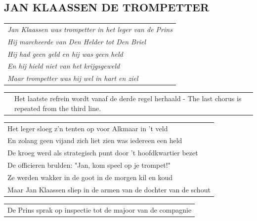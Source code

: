 \documentclass{article}
\begin{document}
\subsection*{JAN KLAASSEN DE TROMPETTER}
\begin{flushleft}
\begin{tabularx}{0.8\textwidth} {
   >{\raggedright\arraybackslash}X}
   \textit{Jan Klaassen was trompetter in het leger van de Prins}\\
\textit{Hij marcheerde van Den Helder tot Den Briel}\\
\textit{Hij had geen geld en hij was geen held}\\
\textit{En hij hield niet van het krijgsgeweld}\\
\textit{Maar trompetter was hij wel in hart en ziel}\\
\end{tabularx}
\end{flushleft}\begin{flushleft}
\begin{tabularx}{\textwidth} {
   c >{\raggedright\arraybackslash}X}
    \hspace{5mm} & {\small Het laatste refrein wordt vanaf de derde regel herhaald - The last chorus is repeated from the third line.}\\
\end{tabularx}
\end{flushleft}\begin{flushleft}
\begin{tabularx}{\textwidth} {
   >{\raggedright\arraybackslash}X}
Het leger sloeg z’n tenten op voor Alkmaar in ’t veld\\
En zolang geen vijand zich liet zien was iedereen een held\\
De kroeg werd als strategisch punt door ’t hoofdkwartier bezet\\
De officieren brulden: "Jan, kom speel op je trompet!"\\
Ze werden wakker in de goot in de morgen kil en koud\\
Maar Jan Klaassen sliep in de armen van de dochter van de schout\\
\end{tabularx}
\end{flushleft}\begin{flushleft}
\begin{tabularx}{\textwidth} {
   >{\raggedright\arraybackslash}X}
De Prins sprak op inspectie tot de majoor van de compagnie\\

\end{tabularx}
\end{flushleft}
\end{document}
